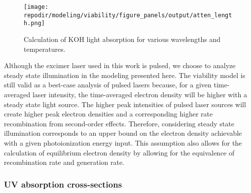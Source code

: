 \begin{figure}[ht]
    \centering
    \texttt{[image: \\repodir/modeling/viability/figure\_panels/output/atten\_length.png]}
    \caption{Calculation of KOH light absorption for various wavelengths and temperatures.}
    \label{fig:SI_atten_length}
\end{figure}

Although the excimer laser used in this work is pulsed, we choose to analyze steady state illumination in the modeling presented here. The viability model is still valid as a best-case analysis of pulsed lasers because, for a given time-averaged laser intensity, the time-averaged electron density will be higher with a steady state light source. The higher peak intensities of pulsed laser sources will create higher peak electron densities and a corresponding higher rate recombination from second-order effects. Therefore, considering steady state illumination corresponds to an upper bound on the electron density achievable with a given photoionization energy input. This assumption also allows for the calculation of equilibrium electron density by allowing for the equivalence of recombination rate and generation rate.

\subsubsection{UV absorption cross-sections}

